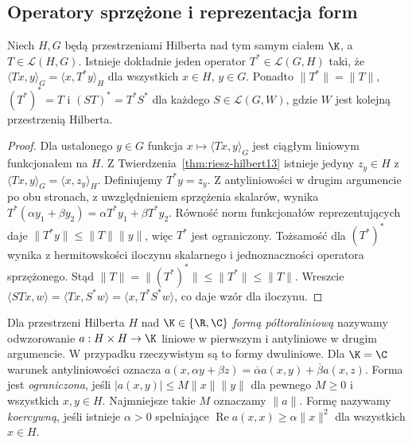 \subsection{Operatory sprzężone i reprezentacja form}

\begin{twierdzenie}
\label{thm:adjoint13}
Niech $H,G$ będą przestrzeniami Hilberta nad tym samym ciałem $\K$,
a $T\in\mathcal L(H,G)$. Istnieje dokładnie jeden operator
$T^*\in\mathcal L(G,H)$ taki, że
$\langle Tx,y\rangle_G=\langle x,T^*y\rangle_H$
dla wszystkich $x\in H$, $y\in G$.
Ponadto $\|T^*\|=\|T\|$, $(T^*)^*=T$ i
$(ST)^*=T^*S^*$ dla każdego $S\in\mathcal L(G,W)$,
gdzie $W$ jest kolejną przestrzenią Hilberta.
\end{twierdzenie}
\begin{proof}
Dla ustalonego $y\in G$ funkcja $x\mapsto\langle Tx,y\rangle_G$
jest ciągłym liniowym funkcjonałem na $H$. Z
Twierdzenia~\ref{thm:riesz-hilbert13} istnieje jedyny $z_y\in H$
z $\langle Tx,y\rangle_G=\langle x,z_y\rangle_H$.
Definiujemy $T^*y=z_y$. Z antyliniowości w drugim argumencie
po obu stronach, z uwzględnieniem sprzężenia skalarów, wynika
$T^*(\alpha y_1+\beta y_2)=\alpha T^*y_1+\beta T^*y_2$.
Równość norm funkcjonałów reprezentujących daje
$\|T^*y\|\le\|T\|\|y\|$, więc $T^*$ jest ograniczony.
Tożsamość dla $(T^*)^*$ wynika z hermitowskości iloczynu
skalarnego i jednoznaczności operatora sprzężonego.
Stąd $\|T\|=\|(T^*)^*\|\le\|T^*\|\le\|T\|$.
Wreszcie
$\langle STx,w\rangle=\langle Tx,S^*w\rangle
=\langle x,T^*S^*w\rangle$, co daje wzór dla iloczynu.
\end{proof}

\begin{definicja}
\label{def:sesquilinear13}
Dla przestrzeni Hilberta $H$ nad $\K\in\{\R,\C\}$
\emph{formą półtoraliniową} nazywamy odwzorowanie
$a:H\times H\to\K$ liniowe w pierwszym i antyliniowe
w drugim argumencie. W przypadku rzeczywistym są to formy
dwuliniowe. Dla $\K=\C$ warunek antyliniowości oznacza
$a(x,\alpha y+\beta z)=\overline\alpha a(x,y)+\overline\beta a(x,z)$. Forma jest \emph{ograniczona}, jeśli
$|a(x,y)|\le M\|x\|\|y\|$ dla pewnego $M\ge0$ i wszystkich
$x,y\in H$. Najmniejsze takie $M$ oznaczamy $\|a\|$.
Formę nazywamy \emph{koercywną}, jeśli istnieje $\alpha>0$
spełniające $\operatorname{Re}a(x,x)\ge\alpha\|x\|^2$
dla wszystkich $x\in H$.
\end{definicja}

